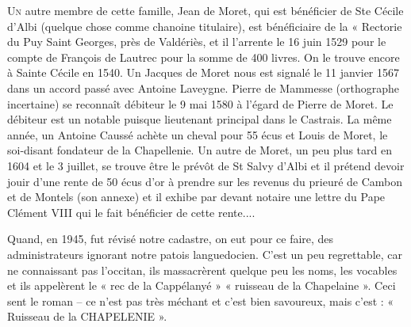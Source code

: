 
\lettrine{U}{n} autre membre de cette famille, Jean de Moret, qui est bénéficier de Ste Cécile d'Albi (quelque chose comme chanoine titulaire), est bénéficiaire de la « Rectorie du Puy Saint Georges, près de Valdériès, et il l'arrente le 16 juin 1529 pour le compte de François de Lautrec pour la somme de 400 livres. On le trouve encore à Sainte Cécile en 1540. Un Jacques de Moret nous est signalé le 11 janvier 1567 dans un accord passé avec Antoine Laveygne. Pierre de Mammesse (orthographe incertaine) se reconnaît débiteur le 9 mai 1580 à l'égard de Pierre de Moret. Le débiteur est un notable puisque lieutenant principal dans le Castrais. La même année, un Antoine Caussé achète un cheval pour 55 écus et Louis de Moret, le soi-disant fondateur de la Chapellenie. Un autre de Moret, un peu plus tard en 1604 et le 3 juillet, se trouve être le prévôt de St Salvy d'Albi et il prétend devoir jouir d'une rente de 50 écus d'or à prendre sur les revenus du prieuré de Cambon et de Montels (son annexe) et il exhibe par devant notaire une lettre du Pape Clément VIII qui le fait bénéficier de cette rente....

\medskip

Quand, en 1945, fut révisé notre cadastre, on eut pour ce faire, des administrateurs ignorant notre patois languedocien. C'est un peu regrettable, car ne connaissant pas l'occitan, ils massacrèrent quelque peu les noms, les vocables et ils appelèrent le « rec de la Cappélanyé » « ruisseau de la Chapelaine ». Ceci sent le roman -- ce n'est pas très méchant et c'est bien savoureux, mais c'est : « Ruisseau de la CHAPELENIE ».
